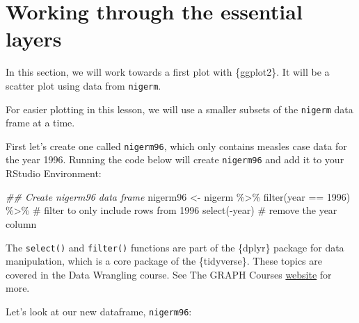 \documentclass[
  letterpaper,
  DIV=11,
  numbers=noendperiod]{scrreprt}
\newenvironment{Shaded}{\begin{snugshade}}{\end{snugshade}}
\newcommand{\CommentTok}[1]{\textcolor[rgb]{0.37,0.37,0.37}{#1}}
\newcommand{\DecValTok}[1]{\textcolor[rgb]{0.68,0.00,0.00}{#1}}
\newcommand{\DocumentationTok}[1]{\textcolor[rgb]{0.37,0.37,0.37}{\textit{#1}}}
\newcommand{\FunctionTok}[1]{\textcolor[rgb]{0.28,0.35,0.67}{#1}}
\newcommand{\NormalTok}[1]{\textcolor[rgb]{0.00,0.23,0.31}{#1}}
\newcommand{\OtherTok}[1]{\textcolor[rgb]{0.00,0.23,0.31}{#1}}
\newcommand{\SpecialCharTok}[1]{\textcolor[rgb]{0.37,0.37,0.37}{#1}}
\begin{document}
\section{Working through the essential
layers}\label{working-through-the-essential-layers}

In this section, we will work towards a first plot with \{ggplot2\}. It
will be a scatter plot using data from \texttt{nigerm}.

For easier plotting in this lesson, we will use a smaller subsets of the
\texttt{nigerm} data frame at a time.

First let's create one called \texttt{nigerm96}, which only contains
measles case data for the year 1996. Running the code below will create
\texttt{nigerm96} and add it to your RStudio Environment:

\begin{Shaded}
\begin{Highlighting}[]
\DocumentationTok{\#\# Create nigerm96 data frame}
\NormalTok{nigerm96 }\OtherTok{\textless{}{-}}\NormalTok{ nigerm }\SpecialCharTok{\%\textgreater{}\%}   
  \FunctionTok{filter}\NormalTok{(year }\SpecialCharTok{==} \DecValTok{1996}\NormalTok{)  }\SpecialCharTok{\%\textgreater{}\%} \CommentTok{\# filter to only include rows from 1996}
  \FunctionTok{select}\NormalTok{(}\SpecialCharTok{{-}}\NormalTok{year) }\CommentTok{\# remove the year column}
\end{Highlighting}
\end{Shaded}

\begin{tcolorbox}[enhanced jigsaw, title=\textcolor{quarto-callout-note-color}{\faInfo}\hspace{0.5em}{Reminder}, colbacktitle=quarto-callout-note-color!10!white, leftrule=.75mm, arc=.35mm, opacityback=0, bottomrule=.15mm, rightrule=.15mm, toptitle=1mm, breakable, toprule=.15mm, colback=white, coltitle=black, colframe=quarto-callout-note-color-frame, bottomtitle=1mm, titlerule=0mm, left=2mm, opacitybacktitle=0.6]

The \texttt{select()} and \texttt{filter()} functions are part of the
\{dplyr\} package for data manipulation, which is a core package of the
\{tidyverse\}. These topics are covered in the Data Wrangling course.
See The GRAPH Courses \href{https://thegraphcourses.org/}{website} for
more.

\end{tcolorbox}

Let's look at our new dataframe, \texttt{nigerm96}:
\end{document}
